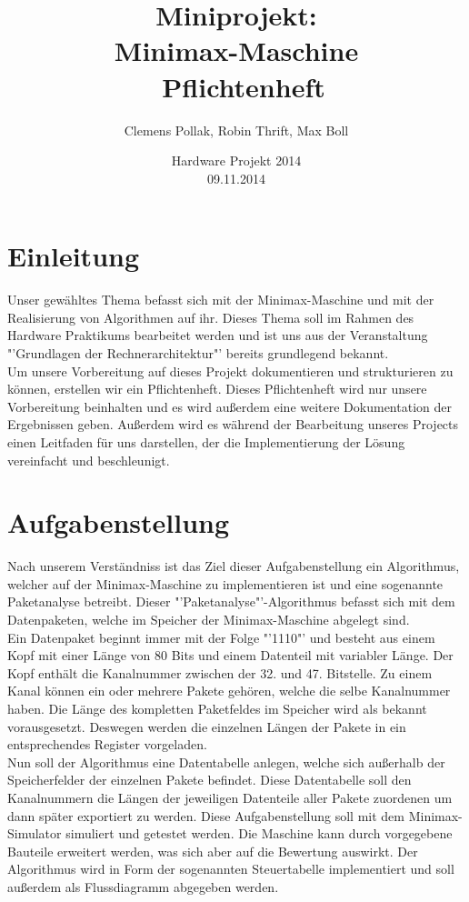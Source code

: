\documentclass[12pt,titlepage]{article}
\begin{document}
\title{Miniprojekt: \\ Minimax-Maschine \\ Pflichtenheft}
\author{Clemens Pollak, Robin Thrift, Max Boll}
\date{Hardware Projekt 2014 \\ 09.11.2014}
\maketitle

\tableofcontents

\newpage

\section{Einleitung} 
Unser gew{\"a}hltes Thema befasst sich mit der Minimax-Maschine und mit der Realisierung von Algorithmen auf ihr. Dieses Thema soll im Rahmen des Hardware Praktikums bearbeitet werden und ist uns aus der Veranstaltung "'Grundlagen der Rechnerarchitektur"' bereits grundlegend bekannt.\\ Um unsere Vorbereitung auf dieses Projekt dokumentieren und strukturieren zu k{\"o}nnen, erstellen wir ein Pflichtenheft. Dieses Pflichtenheft wird nur unsere Vorbereitung beinhalten und es wird au{\ss}erdem eine weitere Dokumentation der Ergebnissen geben. Außerdem wird es w{\"a}hrend der Bearbeitung unseres Projects einen Leitfaden für uns darstellen, der die Implementierung der L{\"o}sung vereinfacht und beschleunigt.

\section{Aufgabenstellung}
Nach unserem Verst{\"a}ndniss ist das Ziel dieser Aufgabenstellung ein Algorithmus, welcher auf der Minimax-Maschine zu implementieren ist und eine sogenannte Paketanalyse betreibt. Dieser "'Paketanalyse"'-Algorithmus befasst sich mit dem Datenpaketen, welche im Speicher der Minimax-Maschine abgelegt sind.\\ Ein Datenpaket beginnt immer mit der Folge "'1110"' und besteht aus einem
Kopf mit einer L{\"a}nge von 80 Bits und einem Datenteil mit variabler L{\"a}nge. Der Kopf enth{\"a}lt die Kanalnummer zwischen der 32. und 47. Bitstelle. Zu einem Kanal k{\"o}nnen ein oder mehrere Pakete geh{\"o}ren, welche die selbe Kanalnummer haben.
Die L{\"a}nge des kompletten Paketfeldes im Speicher wird als bekannt vorausgesetzt. Deswegen werden die einzelnen L{\"a}ngen der Pakete in ein entsprechendes Register vorgeladen.\\
Nun soll der Algorithmus eine Datentabelle anlegen, welche sich au{\ss}erhalb der Speicherfelder der einzelnen Pakete befindet. Diese Datentabelle soll den Kanalnummern die L{\"a}ngen der jeweiligen Datenteile aller Pakete zuordenen um dann später exportiert zu werden. Diese Aufgabenstellung soll mit dem Minimax-Simulator simuliert und getestet werden. Die Maschine kann durch vorgegebene Bauteile erweitert werden, was sich aber auf die Bewertung auswirkt. Der Algorithmus wird in Form der sogenannten Steuertabelle implementiert und soll außerdem als Flussdiagramm abgegeben werden.
\end{document}
